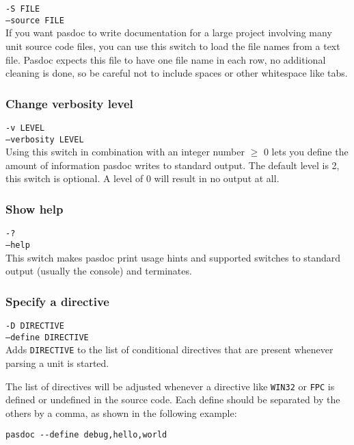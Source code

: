 \documentclass[11pt]{article}
\begin{document}
{\tt -S FILE}\\
{\tt --source FILE}\\

If you want pasdoc to write documentation for a large project involving many
unit source code files, you can use this switch to load the file names from
a text file.
Pasdoc expects this file to have one file name in each row, no additional
cleaning is done, so be careful not to include spaces or other whitespace
like tabs.

\subsubsection{Change verbosity level}

{\tt -v LEVEL}\\
{\tt --verbosity LEVEL}\\

Using this switch in combination with an integer number $\geq$ 0 lets you
define the amount of information pasdoc writes to standard output.
The default level is 2, this switch is optional.
A level of 0 will result in no output at all.

\subsubsection{Show help}

{\tt -?}\\
{\tt --help}\\

This switch makes pasdoc print usage hints and supported switches to standard
output (usually the console) and terminates.

\subsubsection{Specify a directive}
\label{specifydirective}

{\tt -D DIRECTIVE}\\
{\tt --define DIRECTIVE}\\

Adds {\tt DIRECTIVE} to the list of conditional directives that are present
whenever parsing a unit is started.

The list of directives will be adjusted whenever a directive like {\tt WIN32}
or {\tt FPC} is defined or undefined in the source code. Each define should
be separated by the others by a comma, as shown in the following example:

\begin{verbatim}
pasdoc --define debug,hello,world
\end{verbatim}
\end{document}
